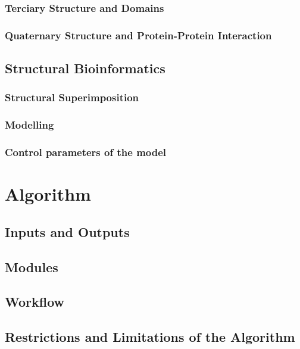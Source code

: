 \documentclass[a4paper,12pt]{report}
\begin{document}
\subsection{Terciary Structure and Domains}


\subsection{Quaternary Structure and Protein-Protein Interaction}







\section{Structural Bioinformatics}

\subsection{Structural Superimposition}

\subsection{Modelling}

\subsection{Control parameters of the model}




\chapter{Algorithm}

\section{Inputs and Outputs}

\section{Modules}

\section{Workflow}

\section{Restrictions and Limitations of the Algorithm}
\end{document}
